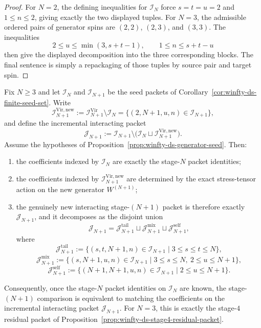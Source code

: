 \begin{proof}
For $N=2$, the defining inequalities for $\mathcal{I}_N$ force
$s=t=u=2$ and $1\le n\le 2$, giving exactly the two displayed tuples.
For $N=3$, the admissible ordered pairs of generator spins are
$(2,2)$, $(2,3)$, and $(3,3)$.  The inequalities
\[
2\le u\le \min(3,s+t-1),
\qquad
1\le n\le s+t-u
\]
then give the displayed decomposition into the three corresponding
blocks.  The final sentence is simply a repackaging of those tuples by
source pair and target spin.
\end{proof}

\begin{proposition}
\label{prop:winfty-ds-stage-growth-packet}
Fix $N \ge 3$ and let $\mathcal{I}_N$ and $\mathcal{I}_{N+1}$ be the
seed packets of Corollary~\ref{cor:winfty-ds-finite-seed-set}.  Write
\[
\mathcal{I}_{N+1}^{\mathrm{Vir,new}}
:=
\mathcal{I}_{N+1}^{\mathrm{Vir}}\setminus \mathcal{I}_N
=
\{(2,N{+}1,u,n)\in \mathcal{I}_{N+1}\},
\]
and define the incremental interacting packet
\[
\mathcal{J}_{N+1}
:=
\mathcal{I}_{N+1}\setminus
\bigl(\mathcal{I}_N\sqcup \mathcal{I}_{N+1}^{\mathrm{Vir,new}}\bigr).
\]
Assume the hypotheses of
Proposition~\ref{prop:winfty-ds-generator-seed}.  Then:
\begin{enumerate}
\item the coefficients indexed by $\mathcal{I}_N$ are exactly the
  stage-$N$ packet identities;
\item the coefficients indexed by
  $\mathcal{I}_{N+1}^{\mathrm{Vir,new}}$ are determined by the exact
  stress-tensor action on the new generator $W^{(N+1)}$;
\item the genuinely new interacting stage-$(N+1)$ packet is therefore
  exactly $\mathcal{J}_{N+1}$, and it decomposes as the disjoint union
  \[
  \mathcal{J}_{N+1}
  =
  \mathcal{J}_{N+1}^{\mathrm{tail}}
  \sqcup
  \mathcal{J}_{N+1}^{\mathrm{mix}}
  \sqcup
  \mathcal{J}_{N+1}^{\mathrm{self}},
  \]
  where
  \[
  \mathcal{J}_{N+1}^{\mathrm{tail}}
  :=
  \{(s,t,N{+}1,n)\in\mathcal{I}_{N+1}\mid 3\le s\le t\le N\},
  \]
  \[
  \mathcal{J}_{N+1}^{\mathrm{mix}}
  :=
  \{(s,N{+}1,u,n)\in\mathcal{I}_{N+1}\mid 3\le s\le N,\ 2\le u\le N{+}1\},
  \]
  \[
  \mathcal{J}_{N+1}^{\mathrm{self}}
  :=
  \{(N{+}1,N{+}1,u,n)\in\mathcal{I}_{N+1}\mid 2\le u\le N{+}1\}.
  \]
\end{enumerate}
Consequently, once the stage-$N$ packet identities on $\mathcal{I}_N$
are known, the stage-$(N+1)$ comparison is equivalent to matching the
coefficients on the incremental interacting packet $\mathcal{J}_{N+1}$.
For $N=3$, this is exactly the stage-$4$ residual packet of
Proposition~\ref{prop:winfty-ds-stage4-residual-packet}.
\end{proposition}

